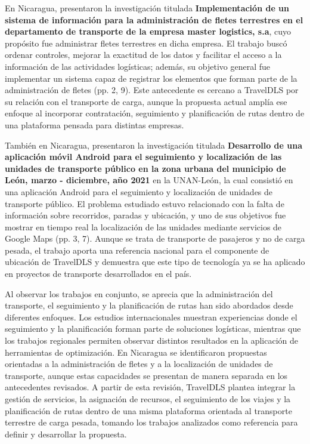\label{ant:aragon}
En Nicaragua, \textcite{aragon2018implementacion} presentaron la investigación titulada \textbf{Implementación de un sistema de información para la administración de fletes terrestres en el departamento de transporte de la empresa master logistics, s.a}, cuyo propósito fue administrar fletes terrestres en dicha empresa. El trabajo buscó ordenar controles, mejorar la exactitud de los datos y facilitar el acceso a la información de las actividades logísticas; además, su objetivo general fue implementar un sistema capaz de registrar los elementos que forman parte de la administración de fletes (pp. 2, 9). Este antecedente es cercano a TravelDLS por su relación con el transporte de carga, aunque la propuesta actual amplía ese enfoque al incorporar contratación, seguimiento y planificación de rutas dentro de una plataforma pensada para distintas empresas.

\label{ant:garcia}
También en Nicaragua, \textcite{garcia2022desarrollo} presentaron la investigación titulada \textbf{Desarrollo de una aplicación móvil Android para el seguimiento y localización de las unidades de transporte público en la zona urbana del municipio de León, marzo - diciembre, año 2021} en la UNAN-León, la cual consistió en una aplicación Android para el seguimiento y localización de unidades de transporte público. El problema estudiado estuvo relacionado con la falta de información sobre recorridos, paradas y ubicación, y uno de sus objetivos fue mostrar en tiempo real la localización de las unidades mediante servicios de Google Maps (pp. 3, 7). Aunque se trata de transporte de pasajeros y no de carga pesada, el trabajo aporta una referencia nacional para el componente de ubicación de TravelDLS y demuestra que este tipo de tecnología ya se ha aplicado en proyectos de transporte desarrollados en el país.

Al observar los trabajos en conjunto, se aprecia que la administración del transporte, el seguimiento y la planificación de rutas han sido abordados desde diferentes enfoques. Los estudios internacionales muestran experiencias donde el seguimiento y la planificación forman parte de soluciones logísticas, mientras que los trabajos regionales permiten observar distintos resultados en la aplicación de herramientas de optimización. En Nicaragua se identificaron propuestas orientadas a la administración de fletes y a la localización de unidades de transporte, aunque estas capacidades se presentan de manera separada en los antecedentes revisados. A partir de esta revisión, TravelDLS plantea integrar la gestión de servicios, la asignación de recursos, el seguimiento de los viajes y la planificación de rutas dentro de una misma plataforma orientada al transporte terrestre de carga pesada, tomando los trabajos analizados como referencia para definir y desarrollar la propuesta.

